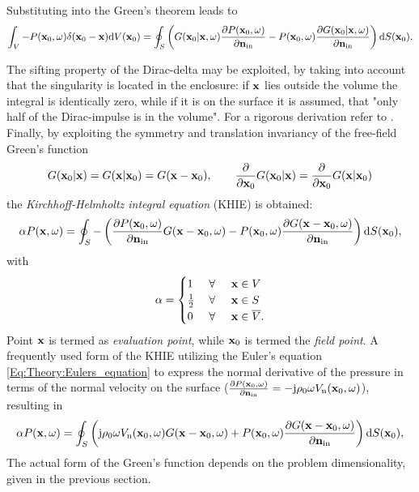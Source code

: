 Substituting into the Green's theorem leads to
\begin{equation}
\int_V - P(\mathbf{x}_0,\omega) \delta(\mathbf{x}_0 - \mathbf{x})
  \mathrm{d} V(\mathbf{x}_0) = 
\oint_{S}  \left(  G(\mathbf{x}_0|\mathbf{x},\omega) \frac{\partial P(\mathbf{x}_0,\omega)}{\partial \mathbf{n}_{\mathrm{in}}}  - P(\mathbf{x}_0,\omega)  \frac{\partial G(\mathbf{x}_0|\mathbf{x},\omega)}{\partial \mathbf{n}_{\mathrm{in}}}  \right)   \mathrm{d} S(\mathbf{x}_0).
\end{equation}

The sifting property of the Dirac-delta may be exploited, by taking into account that the singularity is located in the enclosure: if $\mathbf{x}$ lies outside the volume the integral is identically zero, while if it is on the surface it is assumed, that "only half of the Dirac-impulse is in the volume". {\color{red}For a rigorous derivation refer to \cite{}}.
Finally, by exploiting the symmetry and translation invariancy of the free-field Green's function
\begin{equation}
G(\mathbf{x}_0|\mathbf{x}) = G(\mathbf{x}|\mathbf{x}_0) = G(\mathbf{x}-\mathbf{x}_0), \qquad
\frac{\partial}{\partial \mathbf{x}_0} G(\mathbf{x}_0|\mathbf{x})= \frac{\partial}{\partial \mathbf{x}_0} G(\mathbf{x}|\mathbf{x}_0)
\end{equation}
the \emph{Kirchhoff-Helmholtz integral equation} (KHIE) is obtained:
\begin{equation}
\alpha P(\mathbf{x},\omega) = 
\oint_{S} - \left( 
\frac{\partial P(\mathbf{x}_0,\omega)}{\partial \mathbf{n}_{\mathrm{in}}} G(\mathbf{x}-\mathbf{x}_0,\omega)
-
P(\mathbf{x}_0,\omega)  \frac{\partial G(\mathbf{x}-\mathbf{x}_0,\omega)}{\partial\mathbf{n}_{\mathrm{in}}} 
\right)   \mathrm{d} S( \mathbf{x}_0),
\label{Eq:Theory:Kirchhoff-Helmholtz}
\end{equation}
with
\begin{equation*}
\alpha = \begin{cases} 
1           & \hspace{1mm} \forall \hspace{5mm}  \mathbf{x} \in V  	   \\
\frac{1}{2} & \hspace{1mm} \forall \hspace{5mm}  \mathbf{x} \in S  \\
0 			& \hspace{1mm} \forall \hspace{5mm}  \mathbf{x} \in \overline{V}.
\end{cases}
\end{equation*}
Point $\mathbf{x}$ is termed as \emph{evaluation point}, while $\mathbf{x}_0$ is termed the \emph{field point}. A frequently used form of the KHIE utilizing the Euler's equation \eqref{Eq:Theory:Eulers_equation} to express the normal derivative of the pressure in terms of the normal velocity on the surface ($\frac{\partial P(\mathbf{x}_0,\omega)}{\partial \mathbf{n}_{\mathrm{in}}} = -\mathrm{j} \rho_0 \omega V_{\mathrm{n}}(\mathbf{x}_0,\omega)$), resulting in
\begin{equation}
\alpha P(\mathbf{x},\omega) = 
\oint_{S}  \left(  
\mathrm{j} \rho_0 \omega V_{\mathrm{n}}(\mathbf{x}_0,\omega) G(\mathbf{x}-\mathbf{x}_0,\omega) 
+
P(\mathbf{x}_0,\omega)  \frac{\partial G(\mathbf{x}-\mathbf{x}_0,\omega)}{\partial \mathbf{n}_{\mathrm{in}}}
\right)   \mathrm{d} S(\mathbf{x}_0),
\label{Eq:Theory:Kirchhoff}
\end{equation}
The actual form of the Green's function depends on the problem dimensionality, given in the previous section.

